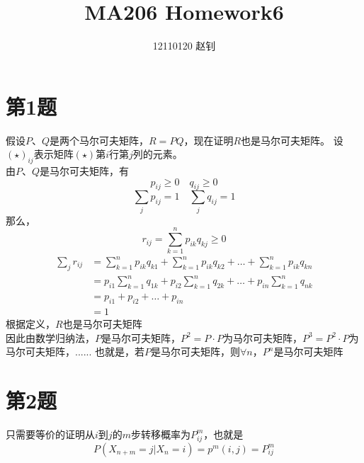 \documentclass{article}
\title{MA206 Homework6}
\author{12110120 赵钊}
\date{}
\begin{document}
\maketitle


\section{第1题}
假设$P$、$Q$是两个马尔可夫矩阵，$R=PQ$，现在证明$R$也是马尔可夫矩阵。
设$(\star)_{ij}$表示矩阵$(\star)$第$i$行第$j$列的元素。\\
由$P$、$Q$是马尔可夫矩阵，有
\[p_{ij} \geq 0 \quad q_{ij} \geq 0\]
\[\sum\limits_j p_{ij} =1 \quad \sum\limits_j q_{ij} =1\]
那么，
\[r_{ij} = \sum\limits_{k=1}^n p_{ik}q_{kj}  \geq0\]
\begin{equation*}
\begin{split}
\sum\limits_j r_{ij}
 &= \sum\limits_{k=1}^n p_{ik}q_{k1} + \sum\limits_{k=1}^n p_{ik}q_{k2} + \dots + \sum\limits_{k=1}^n p_{ik}q_{kn} \\
 &= p_{i1}\sum\limits_{k=1}^n q_{1k} + p_{i2}\sum\limits_{k=1}^n q_{2k} + \dots + p_{in}\sum\limits_{k=1}^n q_{nk} \\
 &= p_{i1} + p_{i2} + \dots + p_{in} \\
 &= 1
\end{split}
\end{equation*}
根据定义，$R$也是马尔可夫矩阵 \\
因此由数学归纳法，$P$是马尔可夫矩阵，$P^2=P\cdot P$为马尔可夫矩阵，$P^3=P^2\cdot P$为马尔可夫矩阵，......
也就是，若$P$是马尔可夫矩阵，则$\forall n$，$P^n$是马尔可夫矩阵


\section{第2题}
只需要等价的证明从$i$到$j$的$m$步转移概率为$P_{ij}^m$，也就是
\[P(X_{n+m}=j|X_n=i)=p^m(i,j)=P_{ij}^m\]
\end{document}
